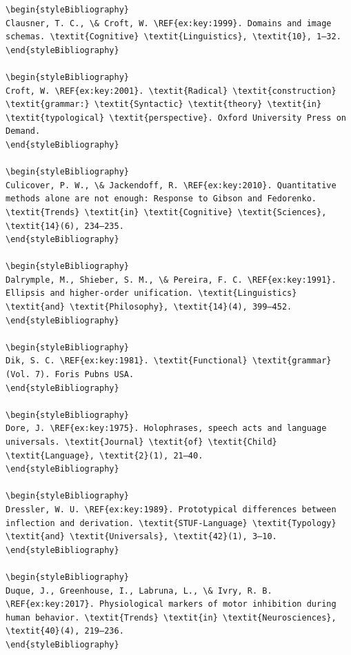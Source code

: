 \begin{verbatim}
\begin{styleBibliography}
Clausner, T. C., \& Croft, W. \REF{ex:key:1999}. Domains and image schemas. \textit{Cognitive} \textit{Linguistics}, \textit{10}, 1–32.
\end{styleBibliography}

\begin{styleBibliography}
Croft, W. \REF{ex:key:2001}. \textit{Radical} \textit{construction} \textit{grammar:} \textit{Syntactic} \textit{theory} \textit{in} \textit{typological} \textit{perspective}. Oxford University Press on Demand.
\end{styleBibliography}

\begin{styleBibliography}
Culicover, P. W., \& Jackendoff, R. \REF{ex:key:2010}. Quantitative methods alone are not enough: Response to Gibson and Fedorenko. \textit{Trends} \textit{in} \textit{Cognitive} \textit{Sciences}, \textit{14}(6), 234–235.
\end{styleBibliography}

\begin{styleBibliography}
Dalrymple, M., Shieber, S. M., \& Pereira, F. C. \REF{ex:key:1991}. Ellipsis and higher-order unification. \textit{Linguistics} \textit{and} \textit{Philosophy}, \textit{14}(4), 399–452.
\end{styleBibliography}

\begin{styleBibliography}
Dik, S. C. \REF{ex:key:1981}. \textit{Functional} \textit{grammar} (Vol. 7). Foris Pubns USA.
\end{styleBibliography}

\begin{styleBibliography}
Dore, J. \REF{ex:key:1975}. Holophrases, speech acts and language universals. \textit{Journal} \textit{of} \textit{Child} \textit{Language}, \textit{2}(1), 21–40.
\end{styleBibliography}

\begin{styleBibliography}
Dressler, W. U. \REF{ex:key:1989}. Prototypical differences between inflection and derivation. \textit{STUF-Language} \textit{Typology} \textit{and} \textit{Universals}, \textit{42}(1), 3–10.
\end{styleBibliography}

\begin{styleBibliography}
Duque, J., Greenhouse, I., Labruna, L., \& Ivry, R. B. \REF{ex:key:2017}. Physiological markers of motor inhibition during human behavior. \textit{Trends} \textit{in} \textit{Neurosciences}, \textit{40}(4), 219–236.
\end{styleBibliography}


\end{verbatim}
